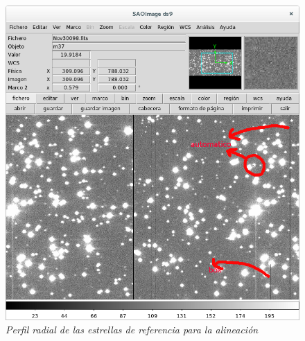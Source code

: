 \documentclass{article}
\begin{document}
\begin{itemize}
\begin{figure}[!ht]
 \centering
 \includegraphics[scale=0.5]{fixpix.png}
 \caption{\emph{Perfil radial de las estrellas de referencia para la alineación}}
\end{figure}


\end{itemize}
\end{document}
